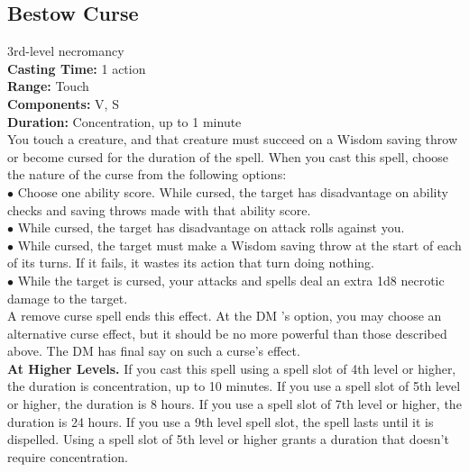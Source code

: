 \documentclass[11pt, A4paper, english]{article}
\begin{document}
		\subsection{Bestow Curse}
3rd-level necromancy \\
\textbf{Casting Time:} 1 action \\
\textbf{Range:} Touch \\
\textbf{Components:} V, S \\
\textbf{Duration:} Concentration, up to 1 minute \\
You touch a creature, and that creature must succeed on a Wisdom saving throw or become cursed for the duration of the spell. When you cast this spell, choose the nature of the curse from the following options: \\
\indent $\bullet$ Choose one ability score. While cursed, the target has disadvantage on ability checks and saving throws made with that ability score. \\
\indent $\bullet$ While cursed, the target has disadvantage on attack rolls against you. \\
\indent $\bullet$ While cursed, the target must make a Wisdom saving throw at the start of each of its turns. If it fails, it wastes its action that turn doing nothing. \\
\indent $\bullet$ While the target is cursed, your attacks and spells deal an extra 1d8 necrotic damage to the target. \\
A remove curse spell ends this effect. At the DM ’s option, you may choose an alternative curse effect, but it should be no more powerful than those described above. The DM has final say on such a curse’s effect. \\
\textbf{At Higher Levels.} If you cast this spell using a spell slot of 4th level or higher, the duration is concentration, up to 10 minutes. If you use a spell slot of 5th level or higher, the duration is 8 hours. If you use a spell slot of 7th level or higher, the duration is 24 hours. If you use a 9th level spell slot, the spell lasts until it is dispelled. Using a spell slot of 5th level or higher grants a duration that doesn’t require concentration.
\end{document}

